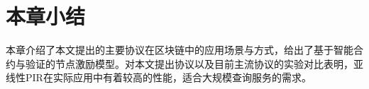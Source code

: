 \section{本章小结}
本章介绍了本文提出的主要协议在区块链中的应用场景与方式，给出了基于智能合约与验证的节点激励模型。对本文提出协议以及目前主流协议的实验对比表明，亚线性PIR在实际应用中有着较高的性能，适合大规模查询服务的需求。